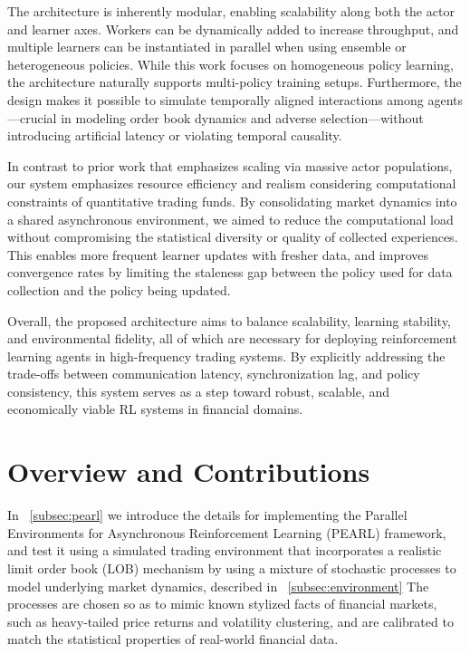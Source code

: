 The architecture is inherently modular, enabling scalability along both the actor and learner axes.
Workers can be dynamically added to increase throughput,
and multiple learners can be instantiated in parallel when using ensemble or heterogeneous policies.
While this work focuses on homogeneous policy learning, the architecture naturally supports multi-policy training setups.
Furthermore, the design makes it possible to simulate temporally aligned interactions among
agents—crucial in modeling order book dynamics and adverse selection—without introducing artificial latency or violating temporal causality.

In contrast to prior work that emphasizes scaling via massive actor populations,
our system emphasizes resource efficiency and realism considering computational constraints of quantitative trading funds.
By consolidating market dynamics into a shared asynchronous environment,
we aimed to reduce the computational load without compromising the statistical diversity or quality of collected experiences.
This enables more frequent learner updates with fresher data, and improves convergence rates by limiting the staleness gap
between the policy used for data collection and the policy being updated.

Overall, the proposed architecture aims to balance scalability, learning stability, and environmental fidelity,
all of which are necessary for deploying reinforcement learning agents in high-frequency trading systems.
By explicitly addressing the trade-offs between communication latency, synchronization lag, and policy consistency,
this system serves as a step toward robust, scalable, and economically viable RL systems in financial domains.

\section{Overview and Contributions}
\label{sec:overview}

In ~\autoref{subsec:pearl} we introduce the details for implementing the Parallel Environments for Asynchronous Reinforcement Learning (PEARL) framework,
and test it using a simulated trading environment that incorporates a realistic limit order book (LOB) mechanism
by using a mixture of stochastic processes to model underlying market dynamics, described in ~\autoref{subsec:environment}
The processes are chosen so as to mimic known stylized facts of financial markets, such as heavy-tailed price returns and
volatility clustering, and are calibrated to match the statistical properties of real-world financial data.

